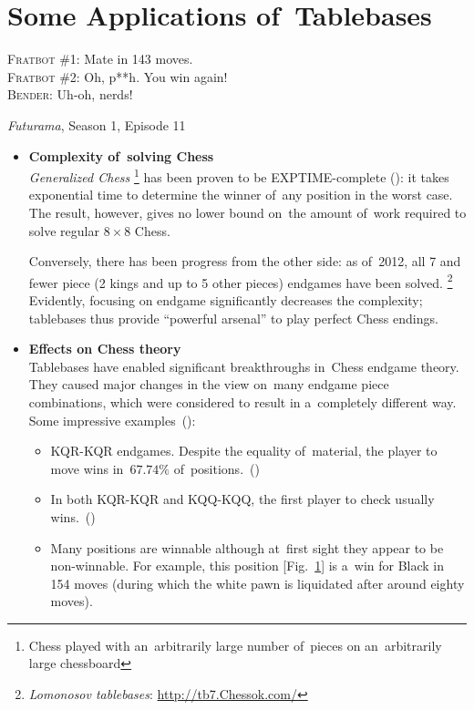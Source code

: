 \section{Some Applications of~Tablebases}
\epigraph{
  \textsc{Fratbot \#1}: Mate in 143 moves. \\
  \textsc{Fratbot \#2}: Oh, p**h. You win again! \\
  \textsc{Bender}:      Uh-oh, nerds!
}{\emph{Futurama}, Season 1, Episode 11}
\begin{itemize}
  \item \textbf{Complexity of~solving Chess}
    \\
    \emph{Generalized Chess}%
    \footnote{Chess played with an~arbitrarily large number of~pieces on an~arbitrarily large chessboard}
    has been proven to be EXPTIME-complete (\cite{Fraenkel1981computing}):
    it takes exponential time to determine the winner of~any position in the worst case.
    The result, however, gives no lower bound on~the amount of~work required to solve regular $8\times 8$ Chess.

    Conversely, there has been progress from the other side:
    as of~2012, all 7 and fewer piece (2 kings and up to 5 other pieces) endgames have been solved.%
    \footnote{\emph{Lomonosov tablebases}: \href{http://tb7.chessok.com/}{http://tb7.Chessok.com/}}
    Evidently, focusing on endgame significantly decreases the complexity; tablebases thus provide ``powerful arsenal'' to play perfect Chess endings.

  \item \textbf{Effects on Chess theory}
    \\
    Tablebases have enabled significant breakthroughs in~Chess endgame theory.
    They caused major changes in the view on~many endgame piece combinations, which were considered to result in a~completely different way.
    Some impressive examples~(\cite{Wikipedia2016endgame}):%
    \begin{itemize}
      \item KQR-KQR endgames.
        Despite the equality of~material, the player to move wins in~$67.74\%$ of~positions.~(\cite{Haworth2001discarding})

      \item In both KQR-KQR and KQQ-KQQ, the first player to check usually wins.~(\cite[p.~379, p.~384]{Nunn2002secrets})

      \item Many positions are winnable although at~first sight they appear to be non-winnable.
        For example, this position [Fig.~\ref{fig:80-moves-to-liquidate-the-pawn}] is a~win for Black in 154 moves (during which the white pawn is liquidated after around eighty moves).
        \begin{figure}[H]
          \centering
          \newgame
          \showboard
          \label{fig:80-moves-to-liquidate-the-pawn}
        \end{figure}


\end{itemize}
\end{itemize}
